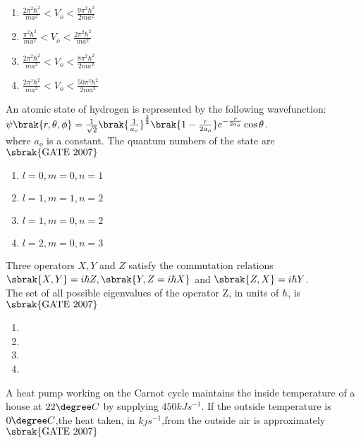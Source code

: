 \begin{multicols}{2}
\begin{enumerate}
    \item $\frac{2\pi^2\hbar^2}{ma^2}<V_o< \frac{9\pi^2\hbar^2}{2ma^2} $
     \item $\frac{\pi^2\hbar^2}{ma^2}<V_o< \frac{2\pi^2\hbar^2}{ma^2} $
      \item $\frac{2\pi^2\hbar^2}{ma^2}<V_o< \frac{8\pi^2\hbar^2}{2ma^2} $
       \item $\frac{2\pi^2\hbar^2}{ma^2}<V_o< \frac{50\pi^2\hbar^2}{2ma^2} $ 
       
\end{enumerate}
\end{multicols}
\item An atomic state of hydrogen is represented by the following wavefunction: $\psi\brak{r,\theta,\phi}= \frac{1}{\sqrt{2}}\brak{\frac{1}{a_o}}^\frac{3}{2} \brak{1-\frac{r}{2a_o}}e^{-\frac{r}{2a_o}}\cos{\theta}$.\\
where $a_o$ is a constant. The quantum numbers of the state are
\hfill{$\sbrak{\text{GATE 2007}}$} \begin{multicols}{2}
\begin{enumerate}
    \item $l=0,m=0,n=1$
    \item $l=1,m=1,n=2$\item $l=1,m=0,n=2$\item $l=2,m=0,n=3$
\end{enumerate} 
\end{multicols}
\item Three operators $X,Y$ and $Z$ satisfy the commutation relations $\sbrak{X,Y}=i\hbar Z,\sbrak{Y,Z=i\hbar X}$ and $\sbrak{Z,X}=i\hbar Y$.\\
The set of all possible eigenvalues of the operator Z, in units of $\hbar$, is \hfill{$\sbrak{\text{GATE 2007}}$} 
\begin{multicols}{2}
 \begin{enumerate}
    \item {}
    \item {}
    \item 
    \item {}
\end{enumerate}
\end{multicols}
\item A heat pump working on the Carnot cycle maintains the inside temperature of a house at $22\degree C$ by supplying $450 kJs^{-1}$. If the outside temperature is $0\degree C$,the heat taken, in $kjs^{-1}$,from the outside air is approximately \hfill{$\sbrak{\text{GATE 2007}}$} 
